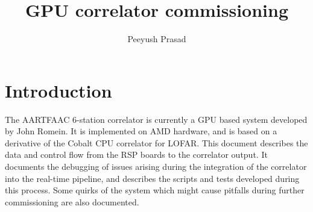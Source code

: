 \documentclass {article}
\begin{document}
\title {GPU correlator commissioning}
\author{Peeyush Prasad}
\maketitle

\section{Introduction}

The AARTFAAC 6-station  correlator is currently a GPU  based system developed by
John Romein. It is  implemented on AMD hardware, and is  based on a derivative of
the  Cobalt CPU  correlator  for LOFAR.  This  document describes  the data  and
control  flow from  the RSP  boards  to the  correlator output. It documents
the debugging of issues arising during the integration of the correlator into
the real-time pipeline,  and describes the scripts and tests developed during
this process. Some quirks of the system which might cause pitfalls during
further commissioning are  also documented.
\end{document}
